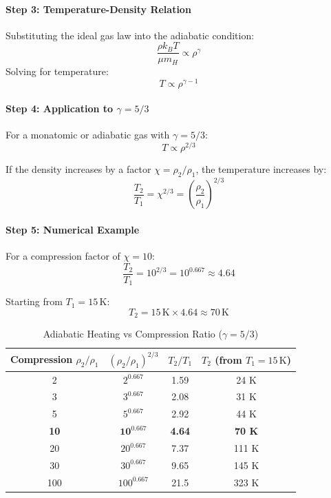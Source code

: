 \documentclass[11pt,a4paper]{article}
\begin{document}
\paragraph{Step 3: Temperature-Density Relation}
Substituting the ideal gas law into the adiabatic condition:
\begin{equation}
    \frac{\rho k_B T}{\mu m_H} \propto \rho^\gamma
\end{equation}
Solving for temperature:
\begin{equation}
    T \propto \rho^{\gamma - 1}
\end{equation}

\paragraph{Step 4: Application to $\gamma = 5/3$}
For a monatomic or adiabatic gas with $\gamma = 5/3$:
\begin{equation}
    \boxed{T \propto \rho^{2/3}}
\end{equation}

If the density increases by a factor $\chi = \rho_2/\rho_1$, the temperature increases by:
\begin{equation}
    \frac{T_2}{T_1} = \chi^{2/3} = \left(\frac{\rho_2}{\rho_1}\right)^{2/3}
\end{equation}

\paragraph{Step 5: Numerical Example}
For a compression factor of $\chi = 10$:
\begin{equation}
    \frac{T_2}{T_1} = 10^{2/3} = 10^{0.667} \approx 4.64
\end{equation}

Starting from $T_1 = 15\,\mathrm{K}$:
\begin{equation}
    T_2 = 15\,\mathrm{K} \times 4.64 \approx 70\,\mathrm{K}
\end{equation}

\begin{table}[h]
\centering
\caption{Adiabatic Heating vs Compression Ratio ($\gamma = 5/3$)}
\begin{tabular}{cccc}
\toprule
\textbf{Compression $\rho_2/\rho_1$} & \textbf{$(\rho_2/\rho_1)^{2/3}$} & \textbf{$T_2/T_1$} & \textbf{$T_2$ (from $T_1 = 15\,\mathrm{K}$)} \\
\midrule
2 & $2^{0.667}$ & 1.59 & 24 K \\
3 & $3^{0.667}$ & 2.08 & 31 K \\
5 & $5^{0.667}$ & 2.92 & 44 K \\
\textbf{10} & $\mathbf{10^{0.667}}$ & \textbf{4.64} & \textbf{70 K} \\
20 & $20^{0.667}$ & 7.37 & 111 K \\
30 & $30^{0.667}$ & 9.65 & 145 K \\
100 & $100^{0.667}$ & 21.5 & 323 K \\
\bottomrule
\end{tabular}
\end{table}
\end{document}
